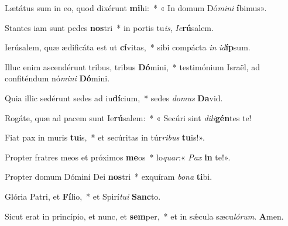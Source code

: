 \item Lætátus sum in eo, quod dixérunt \textbf{mi}hi:~* « In domum Dó\textit{mini} \textbf{í}bimus».

\item Stantes iam sunt pedes \textbf{nos}tri~* in portis tu\textit{is}, \textit{Ie}\textbf{rú}salem.

\item Ierúsalem, quæ ædificáta est ut \textbf{cí}vitas,~* sibi compácta \textit{in} \textit{id}\textbf{íp}sum.

\item Illuc enim ascendérunt tribus, tribus \textbf{Dó}mini,~* testimónium Israël, ad confiténdum nó\textit{mini} \textbf{Dó}mini.

\item Quia illic sedérunt sedes ad iu\textbf{dí}cium,~* sedes \textit{domus} \textbf{Da}vid.

\item Rogáte, quæ ad pacem sunt Ie\textbf{rú}salem:~* « Secúri sint \textit{dili}\textbf{gén}tes te!

\item Fiat pax in muris \textbf{tu}is,~* et secúritas in túr\textit{ribus} \textbf{tu}is!».

\item Propter fratres meos et próximos \textbf{me}os~* lo\textit{quar}:« \textit{Pax} \textbf{in} te!».

\item Propter domum Dómini Dei \textbf{nos}tri~* exquíram \textit{bona} \textbf{ti}bi.

\item Glória Patri, et \textbf{Fí}lio,~* et Spirí\textit{tui} \textbf{Sanc}to.

\item Sicut erat in princípio, et nunc, et \textbf{sem}per,~* et in sǽcula sæcu\textit{lórum}. \textbf{A}men.